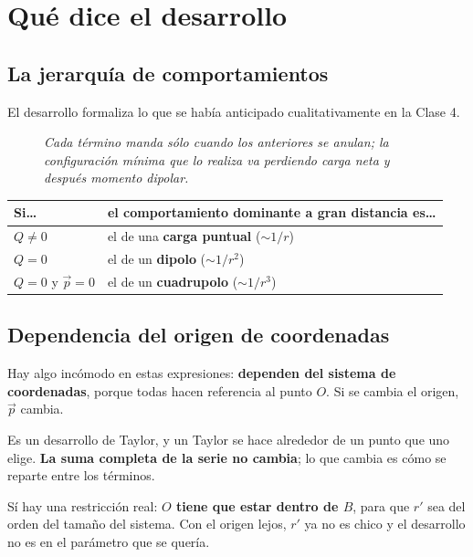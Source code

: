 \documentclass[12pt,a4paper]{article}
\begin{document}
\section{Qué dice el desarrollo}

\subsection{La jerarquía de comportamientos}

El desarrollo formaliza lo que se había anticipado cualitativamente en la Clase 4.

\begin{figure}[H]
  \centering
  
  \caption*{\small\itshape Cada término manda sólo cuando los anteriores se
  anulan; la configuración mínima que lo realiza va perdiendo carga neta y
  después momento dipolar.}
\end{figure}

\begin{table}[H]
  \centering
  \begin{tabular}{@{}ll@{}}
    \toprule
    \textbf{Si\ldots} & \textbf{el comportamiento dominante a gran distancia es\ldots} \\
    \midrule
    $Q \neq 0$ & el de una \textbf{carga puntual} ($\sim 1/r$) \\
    $Q = 0$ & el de un \textbf{dipolo} ($\sim 1/r^2$) \\
    $Q = 0$ y $\vec p = 0$ & el de un \textbf{cuadrupolo} ($\sim 1/r^3$) \\
    \bottomrule
  \end{tabular}
\end{table}

\subsection{Dependencia del origen de coordenadas}

Hay algo incómodo en estas expresiones: \textbf{dependen del sistema de
coordenadas}, porque todas hacen referencia al punto $O$. Si se cambia el origen,
$\vec p$ cambia.

\begin{notebox}
Es un desarrollo de Taylor, y un Taylor se hace alrededor de un punto que uno
elige. \textbf{La suma completa de la serie no cambia}; lo que cambia es cómo se
reparte entre los términos.

Sí hay una restricción real: \textbf{$O$ tiene que estar dentro de $B$}, para que
$r'$ sea del orden del tamaño del sistema. Con el origen lejos, $r'$ ya no es
chico y el desarrollo no es en el parámetro que se quería.
\end{notebox}
\end{document}

